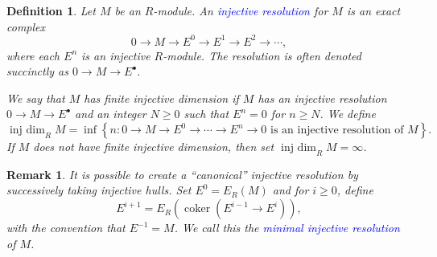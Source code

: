 \documentclass[10pt]{article}
\theoremstyle{thmstyle}
\theoremstyle{defstyle}
\newtheorem{definition}[theorem]{Definition}
\newtheorem{remark}[theorem]{Remark}
\newcommand{\coker}{\operatorname{coker}}
\newcommand{\define}[1]{\textcolor{blue}{\textit{#1}}}
\renewcommand{\ge}{\geqslant}
\newcommand{\injdim}{\operatorname{inj~dim}}
\begin{document}
\begin{definition}
    Let $M$ be an $R$-module. An \define{injective resolution} for $M$ is an exact complex 
    \begin{equation*}
        0\to M\to E^0\to E^1\to E^2\to\cdots,
    \end{equation*}
    where each $E^n$ is an injective $R$-module. The resolution is often denoted succinctly as $0\to M\to E^\bullet$.

    We say that $M$ has finite injective dimension if $M$ has an injective resolution $0\to M\to E^\bullet$ and an integer $N\ge 0$ such that $E^n = 0$ for $n\ge N$. We define 
    \begin{equation*}
        \injdim_R M = \inf\left\{n\colon 0\to M\to E^0\to\cdots\to E^n\to 0\text{ is an injective resolution of } M\right\}.
    \end{equation*}
    If $M$ does not have finite injective dimension, then set $\injdim_R M = \infty$.
\end{definition}

\begin{remark}
    It is possible to create a ``canonical'' injective resolution by successively taking injective hulls. Set $E^0 = E_R(M)$ and for $i\ge 0$, define 
    \begin{equation*}
        E^{i + 1} = E_R\left(\coker\left(E^{i - 1}\to E^i\right)\right),
    \end{equation*}
    with the convention that $E^{-1} = M$. We call this the \define{minimal injective resolution} of $M$.
\end{remark}
\end{document}

